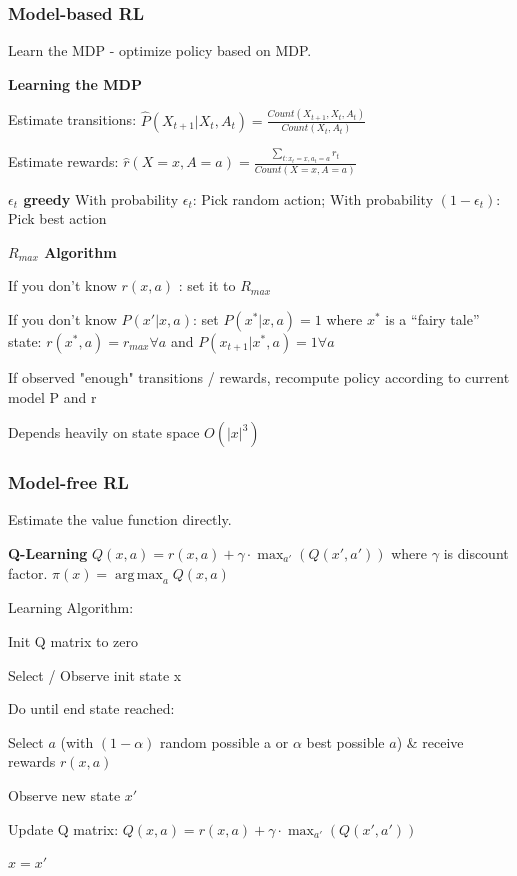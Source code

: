 \documentclass[a4paper, 11pt, landscape]{article}
\DeclareMathOperator*{\argmax}{arg\,max}
\begin{document}
\begin{multicols*}{3}
\subsubsection{Model-based RL }
Learn the MDP - optimize policy based on MDP.

\textbf{Learning the MDP}

Estimate transitions: $\hat{P}(X_{t+1} | X_t, A_t) = \frac{Count(X_{t+1}, X_t, A_t)}{Count(X_t, A_t)}$

Estimate rewards: $\hat{r}(X=x, A= a) = \frac{\sum_{t: x_t = x, a_t = a} r_t}{Count(X = x, A = a)}$

\textbf{ $\epsilon_t$ greedy}
With probability  $\epsilon_t$: Pick random action; With probability $(1- \epsilon_t)$: Pick best action

\textbf{$R_{max}$ Algorithm}

If you don’t know $r(x, a)$ : set it to $R_{max}$

If you don’t know $P(x' | x, a)$: set $P(x^* | x, a) = 1$ where $x^*$ is a “fairy tale” state: $r(x^*, a) = r_{max}  \forall a$ and $P(x_{t+1} | x^*, a) = 1  \forall a$  

If observed "enough" transitions / rewards, recompute policy   according to current model P and r

Depends heavily on state space $O(|x|^3)$


\subsubsection{Model-free RL}
Estimate the value function directly.

\textbf{Q-Learning}
$Q(x, a) = r(x, a) + \gamma \cdot \max_{a'} (Q(x', a'))$ where $\gamma$ is discount factor. $\pi(x) = \argmax_a Q(x, a )$

Learning Algorithm:
\begin{compactitem}
	\item Init Q matrix to zero
	\item Select / Observe init state x
	\item Do until end state reached:
	\item Select $a$ (with $(1-\alpha)$ random possible a or $\alpha$ best possible $a$) \& receive rewards $r(x, a)$
	\item Observe new state $x'$
	\item Update Q matrix: $Q(x, a) = r(x, a) + \gamma \cdot \max_{a'} (Q(x', a'))$
	\item $x = x'$
\end{compactitem}


\end{multicols*}
\end{document}
